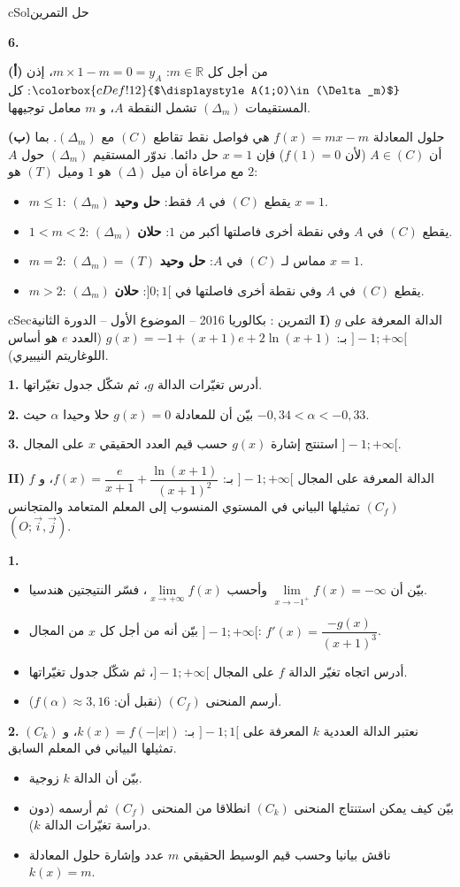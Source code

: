 \documentclass[12pt,a4paper]{article}
\newenvironment{BOX}[2]{\begin{otherlanguage}{english}\begin{arbox}{#1}{#2}}{\end{arbox}\end{otherlanguage}}
\newcounter{exo}
\newenvironment{tamrin}[1]{\stepcounter{exo}\begin{BOX}{cSec}{التمرين \theexo: #1}}{\end{BOX}}
\newenvironment{hal}{\Needspace{12\baselineskip}\begin{otherlanguage}{english}\begin{arbox}[breakable]{cSol}{حل التمرين \theexo}}{\end{arbox}\end{otherlanguage}}
\newcommand{\R}{\mathbb{R}}
\newcommand{\bx}[1]{\ensuremath{\colorbox{cDef!12}{$\displaystyle #1$}}}
\newenvironment{sq}{\begin{itemize}[leftmargin=2.4em,itemsep=3pt]}{\end{itemize}}
\newcommand{\qa}{\item[(أ)]}\newcommand{\qb}{\item[(ب)]}\newcommand{\qc}{\item[(جـ)]}\newcommand{\qd}{\item[(د)]}\newcommand{\qe}{\item[(هـ)]}
\newcommand{\pa}{\par\smallskip\textbf{(أ)} }\newcommand{\pb}{\par\smallskip\textbf{(ب)} }\newcommand{\pc}{\par\smallskip\textbf{(جـ)} }\newcommand{\pd}{\par\smallskip\textbf{(د)} }\newcommand{\pe}{\par\smallskip\textbf{(هـ)} }
\newcommand{\QQ}[1]{\par\smallskip\textbf{#1.} }
\begin{document}
\begin{hal}
\QQ{6}
\pa من أجل كل $m\in\R$: $m\times1-m=0=y_A$، إذن \bx{A(1;0)\in(\Delta_m)}: كل المستقيمات $(\Delta_m)$ تشمل النقطة $A$، و $m$ معامل توجيهها.

\pb حلول المعادلة $f(x)=mx-m$ هي فواصل نقط تقاطع $(C)$ مع $(\Delta_m)$. بما أن $A\in(C)$ (لأن $f(1)=0$) فإن $x=1$ حل دائما.
ندوّر المستقيم $(\Delta_m)$ حول $A$ مع مراعاة أن ميل $(\Delta)$ هو $1$ وميل $(T)$ هو $2$:
\begin{itemize}
\item $m\le 1$: $(\Delta_m)$ يقطع $(C)$ في $A$ فقط: \textbf{حل وحيد} $x=1$.
\item $1<m<2$: $(\Delta_m)$ يقطع $(C)$ في $A$ وفي نقطة أخرى فاصلتها أكبر من $1$: \textbf{حلان}.
\item $m=2$: $(\Delta_m)=(T)$ مماس لـ $(C)$ في $A$: \textbf{حل وحيد} $x=1$.
\item $m>2$: $(\Delta_m)$ يقطع $(C)$ في $A$ وفي نقطة أخرى فاصلتها في $]0;1[$: \textbf{حلان}.
\end{itemize}
\end{hal}

\begin{tamrin}{بكالوريا 2016 -- الموضوع الأول -- الدورة الثانية}
\textbf{I)} $g$ الدالة المعرفة على $]-1;+\infty[$ بـ: $g(x)=-1+(x+1)e+2\ln(x+1)$ (العدد $e$ هو أساس اللوغاريتم النيبيري).
\QQ{1} أدرس تغيّرات الدالة $g$، ثم شكّل جدول تغيّراتها.
\QQ{2} بيّن أن للمعادلة $g(x)=0$ حلا وحيدا $\alpha$ حيث $-0{,}34<\alpha<-0{,}33$.
\QQ{3} استنتج إشارة $g(x)$ حسب قيم العدد الحقيقي $x$ على المجال $]-1;+\infty[$.

\textbf{II)} $f$ الدالة المعرفة على المجال $]-1;+\infty[$ بـ: $f(x)=\dfrac{e}{x+1}+\dfrac{\ln(x+1)}{(x+1)^2}$،
و $(C_f)$ تمثيلها البياني في المستوي المنسوب إلى المعلم المتعامد والمتجانس $(O;\vec i,\vec j)$.
\QQ{1}
\begin{sq}
\qa بيّن أن $\lim\limits_{x\to -1^{+}}f(x)=-\infty$ وأحسب $\lim\limits_{x\to +\infty}f(x)$، فسّر النتيجتين هندسيا.
\qb بيّن أنه من أجل كل $x$ من المجال $]-1;+\infty[$: $f'(x)=\dfrac{-g(x)}{(x+1)^3}$.
\qc أدرس اتجاه تغيّر الدالة $f$ على المجال $]-1;+\infty[$، ثم شكّل جدول تغيّراتها.
\qd أرسم المنحنى $(C_f)$ (نقبل أن: $f(\alpha)\approx 3{,}16$).
\end{sq}
\QQ{2} نعتبر الدالة العددية $k$ المعرفة على $]-1;1[$ بـ: $k(x)=f(-|x|)$، و $(C_k)$ تمثيلها البياني في المعلم السابق.
\begin{sq}
\qa بيّن أن الدالة $k$ زوجية.
\qb بيّن كيف يمكن استنتاج المنحنى $(C_k)$ انطلاقا من المنحنى $(C_f)$ ثم أرسمه (دون دراسة تغيّرات الدالة $k$).
\qc ناقش بيانيا وحسب قيم الوسيط الحقيقي $m$ عدد وإشارة حلول المعادلة $k(x)=m$.
\end{sq}
\end{tamrin}
\end{document}
